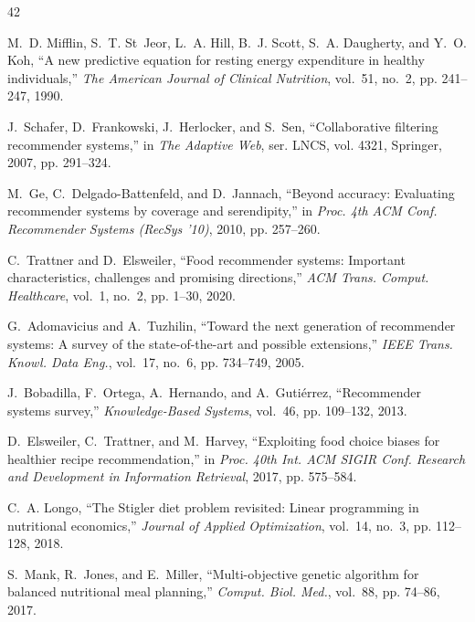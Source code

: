 \documentclass[12pt,a4paper]{report}
\begin{document}
\begin{thebibliography}{42}

M.~D. Mifflin, S.~T. St~Jeor, L.~A. Hill, B.~J. Scott, S.~A. Daugherty, and Y.~O. Koh, ``A new predictive equation for resting energy expenditure in healthy individuals,'' \emph{The American Journal of Clinical Nutrition}, vol.~51, no.~2, pp. 241--247, 1990.

J.~Schafer, D.~Frankowski, J.~Herlocker, and S.~Sen, ``Collaborative filtering recommender systems,'' in \emph{The Adaptive Web}, ser. LNCS, vol. 4321, Springer, 2007, pp. 291--324.

M.~Ge, C.~Delgado-Battenfeld, and D.~Jannach, ``Beyond accuracy: Evaluating recommender systems by coverage and serendipity,'' in \emph{Proc. 4th ACM Conf. Recommender Systems (RecSys '10)}, 2010, pp. 257--260.

C.~Trattner and D.~Elsweiler, ``Food recommender systems: Important characteristics, challenges and promising directions,'' \emph{ACM Trans. Comput. Healthcare}, vol.~1, no.~2, pp. 1--30, 2020.

G.~Adomavicius and A.~Tuzhilin, ``Toward the next generation of recommender systems: A survey of the state-of-the-art and possible extensions,'' \emph{IEEE Trans. Knowl. Data Eng.}, vol.~17, no.~6, pp. 734--749, 2005.

J.~Bobadilla, F.~Ortega, A.~Hernando, and A.~Guti{\'e}rrez, ``Recommender systems survey,'' \emph{Knowledge-Based Systems}, vol.~46, pp. 109--132, 2013.

D.~Elsweiler, C.~Trattner, and M.~Harvey, ``Exploiting food choice biases for healthier recipe recommendation,'' in \emph{Proc. 40th Int. ACM SIGIR Conf. Research and Development in Information Retrieval}, 2017, pp. 575--584.

C.~A. Longo, ``The Stigler diet problem revisited: Linear programming in nutritional economics,'' \emph{Journal of Applied Optimization}, vol.~14, no.~3, pp. 112--128, 2018.

S.~Mank, R.~Jones, and E.~Miller, ``Multi-objective genetic algorithm for balanced nutritional meal planning,'' \emph{Comput. Biol. Med.}, vol.~88, pp. 74--86, 2017.


\end{thebibliography}
\end{document}
